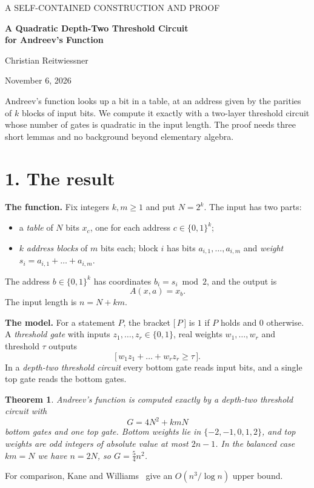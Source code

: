 \documentclass[11pt,letterpaper]{article}
\newtheorem{theorem}{Theorem}
\newcommand{\bits}{\{0,1\}}
\newcommand{\ind}[1]{\bigl[\,#1\,\bigr]}
\newcommand{\sect}[1]{\section*{\color{ink}#1}}
\newcommand{\smalltitle}[1]{\textbf{\color{ink}#1}\quad}
\begin{document}
\thispagestyle{empty}
{\color{accent}\small A SELF-CONTAINED CONSTRUCTION AND PROOF\par}
\vspace{0.4em}
{\raggedright\color{ink}\LARGE\bfseries A Quadratic Depth-Two Threshold Circuit\\[0.15em]
for Andreev's Function\par}
\vspace{0.5em}
{\large Christian Reitwiessner\par}
{\small November 6, 2026\par}
\vspace{0.8em}
Andreev's function looks up a bit in a table, at an address given by the
parities of $k$ blocks of input bits. We compute it exactly with a
two-layer threshold circuit whose number of gates is quadratic in the input
length. The proof needs three short lemmas and no background beyond
elementary algebra.

\sect{1. The result}
\smalltitle{The function.}
Fix integers $k,m\ge1$ and put $N=2^k$. The input has two parts:
\begin{itemize}
\item a \emph{table} of $N$ bits $x_c$, one for each address $c\in\bits^k$;
\item $k$ \emph{address blocks} of $m$ bits each; block $i$ has bits
      $a_{i,1},\dots,a_{i,m}$ and \emph{weight} $s_i=a_{i,1}+\dots+a_{i,m}$.
\end{itemize}
The address $b\in\bits^k$ has coordinates $b_i=s_i \bmod 2$, and the output is
\[
A(x,a)=x_b .
\]
The input length is $n=N+km$.

\smalltitle{The model.}
For a statement $P$, the bracket $\ind{P}$ is $1$ if $P$ holds and $0$
otherwise. A \emph{threshold gate} with inputs $z_1,\dots,z_r\in\bits$,
real weights $w_1,\dots,w_r$ and threshold $\tau$ outputs
\[
\ind{w_1z_1+\dots+w_rz_r\ge\tau}.
\]
In a \emph{depth-two threshold circuit}
every bottom gate reads input bits, and a single top gate reads the
bottom gates.

\begin{theorem}\label{thm:main}
Andreev's function is computed exactly by a depth-two threshold circuit with
\[
G=4N^2+kmN
\]
bottom gates and one top gate. Bottom weights lie in $\{-2,-1,0,1,2\}$, and
top weights are odd integers of absolute value at most $2n-1$.
In the balanced case $km=N$ we have $n=2N$, so $G=\tfrac54n^2$.
\end{theorem}

For comparison, Kane and Williams~\cite{KW} give an $O(n^3/\log n)$ upper bound.
\end{document}
